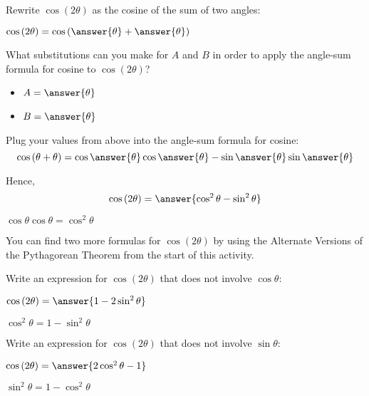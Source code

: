 \documentclass[numbers]{ximera}
\begin{document}
\begin{problem}
Rewrite $\cos\left(2\theta\right)$ as the cosine of the sum of two angles:

$\cos\left(2\theta\right)=\cos\left(\answer{\theta}+\answer{\theta}\right)$
\end{problem}

\begin{problem}
What substitutions can you make for $A$ and $B$ in order to apply the angle-sum formula for cosine to $\cos\left(2\theta\right)$?
\begin{itemize}
	\item $A=\answer{\theta}$
	\item $B=\answer{\theta}$
\end{itemize}
\end{problem}

\begin{problem}
Plug your values from above into the angle-sum formula for cosine:
\[\cos\left(\theta+\theta\right) = \cos\answer{\theta}\cos\answer{\theta}-\sin\answer{\theta}\sin\answer{\theta}\]
\end{problem}

\begin{question}
Hence,
\[\cos\left(2\theta\right)=\answer{\cos^2\theta-\sin^2\theta}\]
\begin{hint}
$\cos\theta\cos\theta=\cos^2\theta$
\end{hint}
\end{question}

You can find two more formulas for $\cos \left(2\theta\right)$ by using the Alternate Versions of the Pythagorean Theorem from the start of this activity.

\begin{problem}
Write an expression for $\cos\left(2\theta\right)$ that does not involve $\cos\theta$:

$\cos\left(2\theta\right) = \answer{1-2\sin^2\theta}$
\begin{hint}
$\cos^2\theta = 1 - \sin^2\theta$
\end{hint}
\end{problem}

\begin{problem}
Write an expression for $\cos\left(2\theta\right)$ that does not involve $\sin\theta$:

$\cos\left(2\theta\right) = \answer{2\cos^2\theta-1}$
\begin{hint}
$\sin^2\theta=1-\cos^2\theta$
\end{hint}
\end{problem}
\end{document}
